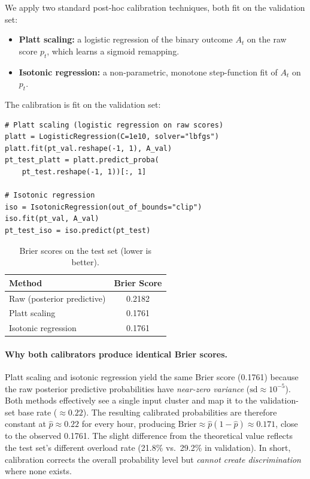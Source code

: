 \documentclass[12pt]{article}
\begin{document}
We apply two standard post-hoc calibration techniques, both fit on the
validation set:

\begin{itemize}
\item \textbf{Platt scaling:} a logistic regression of the binary
  outcome $A_t$ on the raw score $p_t$, which learns a sigmoid
  remapping.
\item \textbf{Isotonic regression:} a non-parametric, monotone
  step-function fit of $A_t$ on $p_t$.
\end{itemize}

The calibration is fit on the validation set:
\begin{small}
\begin{verbatim}
# Platt scaling (logistic regression on raw scores)
platt = LogisticRegression(C=1e10, solver="lbfgs")
platt.fit(pt_val.reshape(-1, 1), A_val)
pt_test_platt = platt.predict_proba(
    pt_test.reshape(-1, 1))[:, 1]

# Isotonic regression
iso = IsotonicRegression(out_of_bounds="clip")
iso.fit(pt_val, A_val)
pt_test_iso = iso.predict(pt_test)
\end{verbatim}
\end{small}

\begin{table}[H]
\centering
\caption{Brier scores on the test set (lower is better).}
\label{tab:brier}
\begin{tabular}{lc}
\toprule
\textbf{Method} & \textbf{Brier Score} \\
\midrule
Raw (posterior predictive) & 0.2182 \\
Platt scaling              & 0.1761 \\
Isotonic regression        & 0.1761 \\
\bottomrule
\end{tabular}
\end{table}

\paragraph{Why both calibrators produce identical Brier scores.}
Platt scaling and isotonic regression yield the same Brier score
(0.1761) because the raw posterior predictive probabilities have
\emph{near-zero variance} ($\text{sd} \approx 10^{-5}$).  Both
methods effectively see a single input cluster and map it to the
validation-set base rate ($\approx 0.22$).  The resulting calibrated
probabilities are therefore constant at $\hat{p} \approx 0.22$ for
every hour, producing $\text{Brier} \approx \hat{p}(1-\hat{p})
\approx 0.171$, close to the observed 0.1761.  The slight difference
from the theoretical value reflects the test set's different overload
rate (21.8\% vs.\ 29.2\% in validation).  In short, calibration
corrects the overall probability level but \emph{cannot create
discrimination} where none exists.
\end{document}
